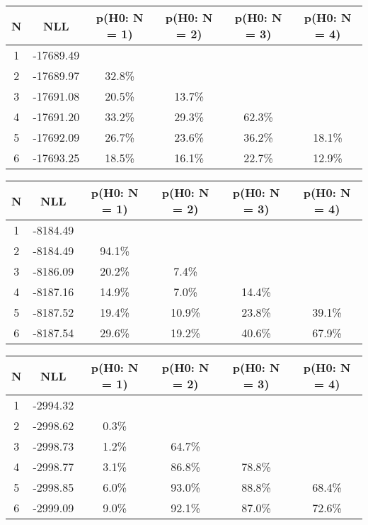 \begin{table}[htb]
	\begin{center}
{\footnotesize\renewcommand{\arraystretch}{1.4}
		\begin{tabular}{cc||cccc}
			N & NLL & p(H0: N = 1) & p(H0: N = 2) & p(H0: N = 3) & p(H0: N = 4)\\ 
		\hline
1 & -17689.49 & & & & \\
2 & -17689.97 & 32.8\% & & & \\
3 & -17691.08 & 20.5\% & 13.7\% & & \\
4 & -17691.20 & 33.2\% & 29.3\% & 62.3\% & \\
5 & -17692.09 & 26.7\% & 23.6\% & 36.2\% & 18.1\% \\
6 & -17693.25 & 18.5\% & 16.1\% & 22.7\% & 12.9\% \\
	\end{tabular}
		\label{tab:lab}
	}
	\end{center}\end{table}

\begin{table}[htb]
	\begin{center}
{\footnotesize\renewcommand{\arraystretch}{1.4}
		\begin{tabular}{cc||cccc}
			N & NLL & p(H0: N = 1) & p(H0: N = 2) & p(H0: N = 3) & p(H0: N = 4)\\ 
		\hline
1 & -8184.49 & & & & \\
2 & -8184.49 & 94.1\% & & & \\
3 & -8186.09 & 20.2\% & 7.4\% & & \\
4 & -8187.16 & 14.9\% & 7.0\% & 14.4\% & \\
5 & -8187.52 & 19.4\% & 10.9\% & 23.8\% & 39.1\% \\
6 & -8187.54 & 29.6\% & 19.2\% & 40.6\% & 67.9\% \\
	\end{tabular}
		\label{tab:lab}
	}
	\end{center}\end{table}

\begin{table}[htb]
	\begin{center}
{\footnotesize\renewcommand{\arraystretch}{1.4}
		\begin{tabular}{cc||cccc}
			N & NLL & p(H0: N = 1) & p(H0: N = 2) & p(H0: N = 3) & p(H0: N = 4)\\ 
		\hline
1 & -2994.32 & & & & \\
2 & -2998.62 & 0.3\% & & & \\
3 & -2998.73 & 1.2\% & 64.7\% & & \\
4 & -2998.77 & 3.1\% & 86.8\% & 78.8\% & \\
5 & -2998.85 & 6.0\% & 93.0\% & 88.8\% & 68.4\% \\
6 & -2999.09 & 9.0\% & 92.1\% & 87.0\% & 72.6\% \\
	\end{tabular}
		\label{tab:lab}
	}
	\end{center}\end{table}

